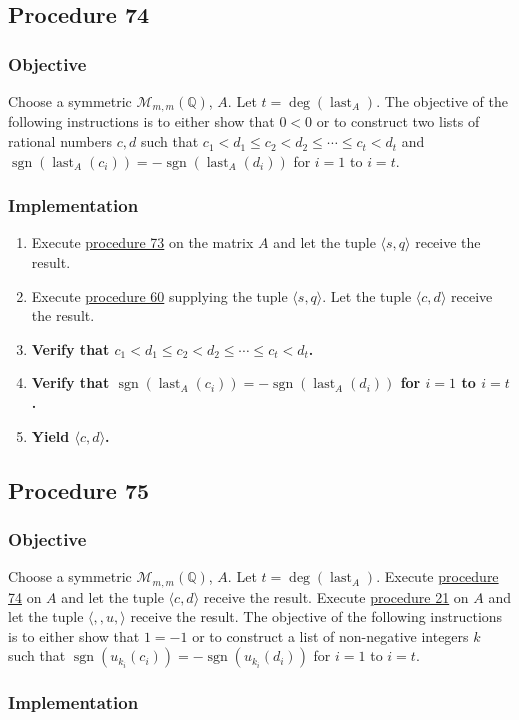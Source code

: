 \documentclass[twocolumn]{article}
\DeclareMathOperator{\sgn}{sgn}
\DeclareMathOperator{\last}{last}
\newcommand{\procedure}[2][]{\subsection*{Procedure #2 \ifthenelse{\equal{#1}{}}{}{(#1)}}\label{sec:procedure #2}}
\newcommand{\objective}{\subsubsection*{Objective}}
\newcommand{\implementation}{\subsubsection*{Implementation}}
\begin{document}
		\procedure{74}
			\objective
				Choose a symmetric $\mathcal{M}_{m,m}(\mathbb{Q})$, $A$. Let $t=\deg(\last_A)$. The objective of the following instructions is to either show that $0<0$ or to construct two lists of rational numbers $c,d$ such that $c_1<d_1\le c_2<d_2\le\cdots\le c_t<d_t$ and $\sgn(\last_A(c_i))=-\sgn(\last_A(d_i))$ for $i=1$ to $i=t$.
			\implementation
				\begin{enumerate}
					\item Execute \hyperref[sec:procedure 73]{procedure 73} on the matrix $A$ and let the tuple $\langle s,q\rangle$ receive the result.
					\item Execute \hyperref[sec:procedure 60]{procedure 60} supplying the tuple $\langle s,q\rangle$. Let the tuple $\langle c,d\rangle$ receive the result.
					\item \textbf{Verify that $c_1<d_1\le c_2<d_2\le\cdots\le c_t<d_t$.}
					\item \textbf{Verify that $\sgn(\last_A(c_i))=-\sgn(\last_A(d_i))$ for $i=1$ to $i=t$.}
					\item \textbf{Yield $\langle c,d\rangle$.}
				\end{enumerate}
		\procedure{75}
			\objective
				Choose a symmetric $\mathcal{M}_{m,m}(\mathbb{Q})$, $A$. Let $t=\deg(\last_A)$. Execute \hyperref[sec:procedure 74]{procedure 74} on $A$ and let the tuple $\langle c,d\rangle$ receive the result. Execute \hyperref[sec:procedure 21]{procedure 21} on $A$ and let the tuple $\langle,,u,\rangle$ receive the result. The objective of the following instructions is to either show that $1=-1$ or to construct a list of non-negative integers $k$ such that $\sgn(u_{k_i}(c_i))=-\sgn(u_{k_i}(d_i))$ for $i=1$ to $i=t$.
			\implementation
\end{document}
